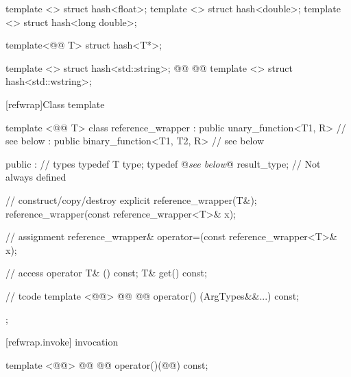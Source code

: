 \documentclass[american,twoside]{book}
\begin{document}
\begin{codeblock}
{  template <> struct hash<float>;
  template <> struct hash<double>;
  template <> struct hash<long double>;

  template<@@ T> struct hash<T*>;

  template <> struct hash<std::string>;
  @@
  @@
  template <> struct hash<std::wstring>;
}
\end{codeblock}

\setcounter{subsection}{4}
[refwrap]{\marktr{}Class template }

\begin{codeblock}
template <@@ T> class reference_wrapper 
  : public unary_function<T1, R>          // see below
  : public binary_function<T1, T2, R>     // see below
{ 
public :
  // types
  typedef T type;
  typedef @\textit{see below}@ result_type; // Not always defined

  // construct/copy/destroy
  explicit reference_wrapper(T&);
  reference_wrapper(const reference_wrapper<T>& x);

  // assignment
  reference_wrapper& operator=(const reference_wrapper<T>& x);

  // access
  operator T& () const;
  T& get() const;

  // tcode{}
  template <@@>
    @@
    @@
  operator() (ArgTypes&&...) const;
}; 
\end{codeblock}

\setcounter{subsubsection}{3}
[refwrap.invoke]{ invocation}
%
%
\begin{itemdecl}
template <@@>
  @@
  @@
    operator()(@@) const;
\end{itemdecl}
\end{document}
